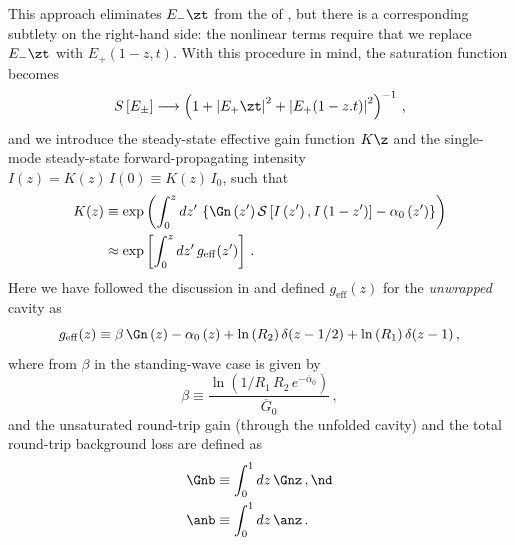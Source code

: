 This approach eliminates $E_{-}\zt$ from the \lhs of , but there is a corresponding subtlety on the right-hand side: the nonlinear terms require that we replace $E_{-}\zt$ with $E_{+}(1 - z, t)$. With this procedure in mind, the saturation function becomes
\begin{equation}
    S\left[E_\pm\right] \longrightarrow \left(1 + \left|E_+\zt\right|^2 + \left|E_+(1 - z. t)\right|^2\right)^{-1}\, ,
\end{equation}
and we introduce the steady-state effective gain function $K\z$ and the single-mode steady-state forward-propagating intensity $I(z) = K(z)\, I(0) \equiv K(z)\, I_0$, such that
\begin{equation} \label{eqn:mflt_kz_def}
    \begin{split}
        K(z) &\equiv \exp\left(\int_0^z d z^\prime\, \left\{\Gn\left(z^\prime\right) \mathcal{S}\left[I\left(z^\prime\right), I\left(1 - z^\prime\right)\right] - \alpha_0\left(z^\prime\right)\right\}\right)\\
        &\approx \exp\left[ \int_0^z d z^\prime\, g_\mathrm{eff}(z^\prime) \right]\, .
    \end{split}
\end{equation}
Here we have followed the discussion in  and defined $g_\mathrm{eff}(z)$ for the \emph{unwrapped} cavity as
\begin{equation}
    g_\mathrm{eff}(z) \equiv \beta\, \Gn\left(z\right) - \alpha_0\left(z\right) + \ln\left(R_2\right) \delta(z - 1/2) + \ln\left(R_1\right) \delta(z - 1)\, ,
\end{equation}
where from  $\beta$ in the standing-wave case is given by  
\begin{equation}
    \label{sml_1d_u_swl_nu_beta}
    \beta \equiv \frac{\ln(1/R_1\, R_2\, e^{-\overline{\alpha}_0})}{\overline{G}_0}\, ,
\end{equation}
and the unsaturated round-trip gain (through the unfolded cavity) and the total round-trip background loss are defined as
\begin{subequations}
    \begin{align}
        \Gnb &\equiv \int_0^1 d z\, \Gnz\, , \nd \\
        \anb &\equiv \int_0^1 d z\, \anz\, .
    \end{align}
\end{subequations}
